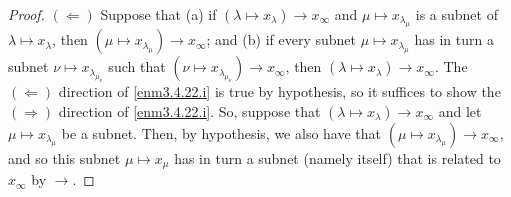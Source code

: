 \begin{prp}
\begin{proof}
$(\Leftarrow )$ Suppose that (a) if $(\lambda \mapsto x_\lambda )\to x_\infty$ and $\mu \mapsto x_{\lambda _\mu}$ is a subnet of $\lambda \mapsto x_\lambda$, then $(\mu \mapsto x_{\lambda _\mu})\to x_\infty$; and (b) if every subnet $\mu \mapsto x_{\lambda _\mu}$ has in turn a subnet $\nu \mapsto x_{\lambda _{\mu _\nu}}$ such that $(\nu \mapsto x_{\lambda _{\mu _\nu}})\to x_\infty$, then $(\lambda \mapsto x_\lambda )\to x_\infty$.  The $(\Leftarrow )$ direction of \ref{enm3.4.22.i} is true by hypothesis, so it suffices to show the $(\Rightarrow )$ direction of \ref{enm3.4.22.i}.  So, suppose that $(\lambda \mapsto x_\lambda )\to x_\infty$ and let $\mu \mapsto x_{\lambda _\mu}$ be a subnet.  Then, by hypothesis, we also have that $(\mu \mapsto x_{\lambda _\mu})\to x_\infty$, and so this subnet $\mu \mapsto x_\mu$ has in turn a subnet (namely itself) that is related to $x_\infty$ by $\to$.
\end{proof}
\end{prp}

